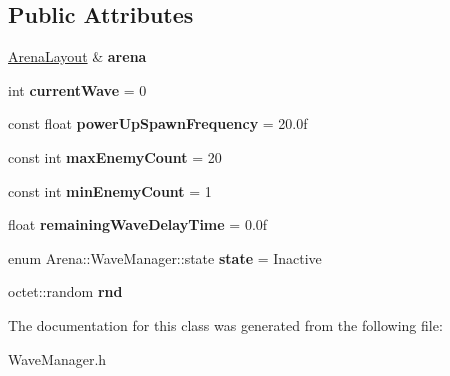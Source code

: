\subsection*{Public Attributes}
\begin{DoxyCompactItemize}
\item 
\hypertarget{class_arena_1_1_wave_manager_a631cabcb38f6bf0f34b66eeeb34e637b}{\hyperlink{class_arena_1_1_arena_layout}{Arena\+Layout} \& {\bfseries arena}}\label{class_arena_1_1_wave_manager_a631cabcb38f6bf0f34b66eeeb34e637b}

\item 
\hypertarget{class_arena_1_1_wave_manager_a4d5c0b5708e06ec98b7049e6c2b79456}{int {\bfseries current\+Wave} = 0}\label{class_arena_1_1_wave_manager_a4d5c0b5708e06ec98b7049e6c2b79456}

\item 
\hypertarget{class_arena_1_1_wave_manager_aa95ee2791287f122b47cc5e50e901e1d}{const float {\bfseries power\+Up\+Spawn\+Frequency} = 20.\+0f}\label{class_arena_1_1_wave_manager_aa95ee2791287f122b47cc5e50e901e1d}

\item 
\hypertarget{class_arena_1_1_wave_manager_a696fbd7b6b9c1fa423d248eb1bf0fecc}{const int {\bfseries max\+Enemy\+Count} = 20}\label{class_arena_1_1_wave_manager_a696fbd7b6b9c1fa423d248eb1bf0fecc}

\item 
\hypertarget{class_arena_1_1_wave_manager_aab528a9a63074e504314bd92996c46da}{const int {\bfseries min\+Enemy\+Count} = 1}\label{class_arena_1_1_wave_manager_aab528a9a63074e504314bd92996c46da}

\item 
\hypertarget{class_arena_1_1_wave_manager_a48489cdf8e5d19074e3cf19cb7bb651c}{float {\bfseries remaining\+Wave\+Delay\+Time} = 0.\+0f}\label{class_arena_1_1_wave_manager_a48489cdf8e5d19074e3cf19cb7bb651c}

\item 
\hypertarget{class_arena_1_1_wave_manager_a5b32f0c7b876e2286a0d18d73ffeb868}{enum Arena\+::\+Wave\+Manager\+::state {\bfseries state} = Inactive}\label{class_arena_1_1_wave_manager_a5b32f0c7b876e2286a0d18d73ffeb868}

\item 
\hypertarget{class_arena_1_1_wave_manager_a8e433f39cd4c7998f6aead32e0c88d5d}{octet\+::random {\bfseries rnd}}\label{class_arena_1_1_wave_manager_a8e433f39cd4c7998f6aead32e0c88d5d}

\end{DoxyCompactItemize}


The documentation for this class was generated from the following file\+:\begin{DoxyCompactItemize}
\item 
Wave\+Manager.\+h\end{DoxyCompactItemize}
